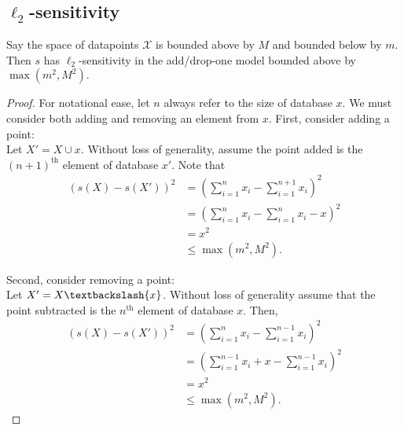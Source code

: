 \documentclass[11pt]{scrartcl} %
\begin{document}
\subsection{$\ell_2$-sensitivity}

\begin{theorem}
Say the space of datapoints $\mathcal{X}$ is bounded above by $M$ and bounded below by $m$. Then $s$ has $\ell_2$-sensitivity in the add/drop-one model bounded above by $\max(m^2, M^2).$
\end{theorem}

\begin{proof}
For notational ease, let $n$ always refer to the size of database $x$. We must consider both adding and removing an element from $x$. First, consider adding a point:\\

Let $X' = X \cup {x}$. Without loss of generality, assume the point added is the $(n+1)^{\text{th}}$ element of database $x'$. Note that
\begin{align*}
\left(s(X) - s(X') \right)^2 &= \left( \sum_{i=1}^n x_i - \sum_{i=1}^{n+1} x_i \right)^2 \\
	&= \left( \sum_{i=1}^n x_i - \sum_{i=1}^n x_i - x \right)^2 \\
	&= x^2 \\
	&\le \max(m^2, M^2).
\end{align*}

Second, consider removing a point: \\
Let $X' = X\textbackslash\{x\}$. Without loss of generality assume that the point subtracted is the $n^{\text{th}}$ element of database $x$. Then,
\begin{align*}
\left(s(X) - s(X') \right)^2 &= \left( \sum_{i=1}^n x_i - \sum_{i=1}^{n-1} x_i \right)^2 \\
	&= \left( \sum_{i=1}^{n-1} x_i + x - \sum_{i=1}^{n-1} x_i \right)^2 \\
	 &=x^2 \\
	 &\le \max(m^2, M^2).
\end{align*}
\end{proof}

% 
% 
\end{document}
